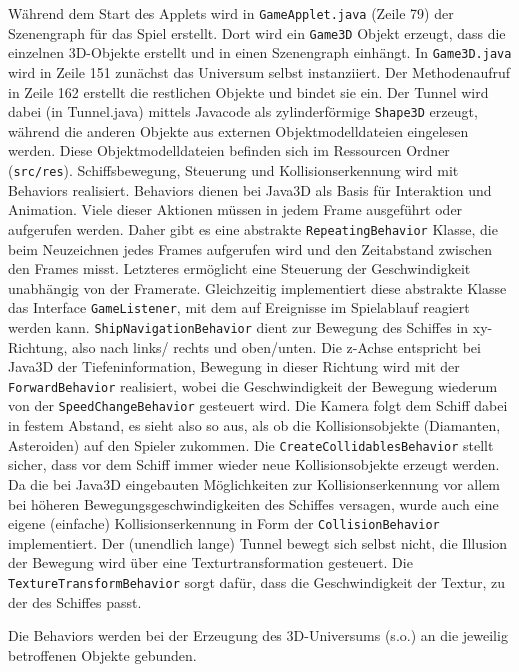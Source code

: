 \documentclass[a4paper,12pt]{scrartcl}
\begin{document}
Während dem Start des Applets wird in \texttt{GameApplet.java} (Zeile 79) der
Szenengraph für das Spiel erstellt. Dort wird ein \texttt{Game3D} Objekt
erzeugt, dass die einzelnen 3D-Objekte erstellt und in einen Szenengraph
einhängt. In \texttt{Game3D.java} wird in Zeile 151 zunächst das Universum
selbst instanziiert. Der Methodenaufruf in Zeile 162 erstellt die restlichen Objekte und bindet sie ein. Der Tunnel wird dabei (in Tunnel.java) mittels
Javacode als zylinderförmige \texttt{Shape3D} erzeugt, während die anderen
Objekte aus externen Objektmodelldateien eingelesen werden. Diese Objektmodelldateien befinden sich im
Ressourcen Ordner (\texttt{src/res}).
Schiffsbewegung, Steuerung und Kollisionserkennung wird mit Behaviors realisiert.
Behaviors dienen bei Java3D als Basis für Interaktion und Animation. Viele dieser Aktionen
müssen in jedem Frame ausgeführt oder aufgerufen werden. Daher gibt es eine abstrakte
\texttt{RepeatingBehavior} Klasse, die beim Neuzeichnen jedes Frames aufgerufen
wird und den Zeitabstand zwischen den Frames misst. Letzteres ermöglicht eine Steuerung der
Geschwindigkeit unabhängig von der Framerate. Gleichzeitig implementiert diese abstrakte
Klasse das Interface \texttt{GameListener}, mit dem auf Ereignisse im
Spielablauf reagiert werden kann.
\texttt{ShipNavigationBehavior} dient zur Bewegung des Schiffes in xy-Richtung,
also nach links/ rechts und oben/unten. Die z-Achse entspricht bei Java3D der Tiefeninformation, Bewegung
in dieser Richtung wird mit der \texttt{ForwardBehavior} realisiert, wobei die
Geschwindigkeit der Bewegung wiederum von der \texttt{SpeedChangeBehavior}
gesteuert wird. Die Kamera folgt dem Schiff dabei in festem Abstand, es sieht also so aus, als ob die Kollisionsobjekte
(Diamanten, Asteroiden) auf den Spieler zukommen. Die
\texttt{CreateCollidablesBehavior} stellt sicher, dass vor dem Schiff immer wieder neue Kollisionsobjekte erzeugt werden.
Da die bei Java3D eingebauten Möglichkeiten zur Kollisionserkennung vor allem bei
höheren Bewegungsgeschwindigkeiten des Schiffes versagen, wurde auch eine eigene
(einfache) Kollisionserkennung in Form der \texttt{CollisionBehavior}
implementiert. Der (unendlich lange) Tunnel bewegt sich selbst nicht, die Illusion der Bewegung wird über eine
Texturtransformation gesteuert. Die \texttt{TextureTransformBehavior} sorgt
dafür, dass die Geschwindigkeit der Textur, zu der des Schiffes passt.

Die Behaviors werden bei der Erzeugung des 3D-Universums (s.o.) an die jeweilig
betroffenen Objekte gebunden.
\end{document}
